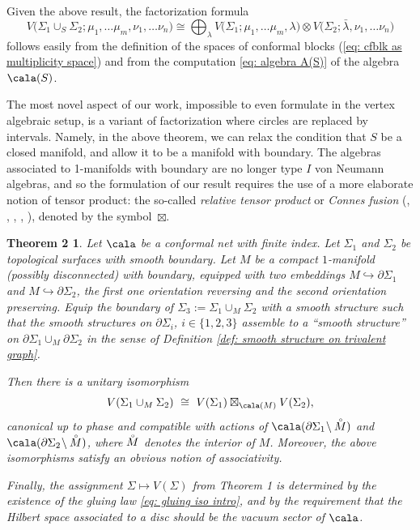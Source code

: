 \documentclass[a4paper,10pt,leqno]{amsart}
\theoremstyle{plain}
\newtheorem*{theorem4*}{Theorem 2}
\theoremstyle{definition}
\theoremstyle{remark}
\begin{document}
Given the above result, the factorization formula
\[
V\big(\Sigma_1\cup_S\Sigma_2;\mu_1,\ldots\mu_m,\nu_1,\ldots\nu_n\big) \cong {\bigoplus}_\lambda V\big(\Sigma_1;\mu_1,\ldots\mu_m,\lambda\big)\otimes
V\big(\Sigma_2;\bar\lambda,\nu_1,\ldots\nu_n\big)
\]
follows easily from the definition of the spaces of conformal blocks (\ref{eq: cfblk as multiplicity space}) and from the computation \eqref{eq: algebra A(S)} of the algebra $\cala(S)$. 

The most novel aspect of our work, impossible to even formulate in the vertex algebraic setup, is a variant of factorization where circles are replaced by intervals.
Namely, in the above theorem, we can relax the condition that $S$ be a closed manifold, and allow it to be a manifold with boundary.
The algebras associated to 1-manifolds with boundary are no longer type $I$ von Neumann algebras, and so
the formulation of our result requires the use of a more elaborate notion of tensor product: the so-called \emph{relative tensor product} or \emph{Connes fusion} (\cite{BDH(dualizability)}, \cite{Bisch(Bimodules)}, \cite{Connes(Non-commutative-geometry)}, \cite{Sauvageot(Sur-le-produit-tensoriel-relatif)}, \cite{Wassermann(Operator-algebras-and-conformal-field-theory)}), denoted by the symbol~$\boxtimes$.

\begin{theorem4*}
Let $\cala$ be a conformal net with finite index.
Let $\Sigma_1$ and $\Sigma_2$ be topological surfaces with smooth boundary.
Let $M$ be a compact $1$-manifold (possibly disconnected) with boundary, equipped with two
embeddings $M\hookrightarrow \partial \Sigma_1$ and $M\hookrightarrow \partial \Sigma_2$,
the first one orientation reversing and the second orientation preserving.
Equip the boundary of $\Sigma_3:=\Sigma_1\cup_M \Sigma_2$ with a smooth structure such that
the smooth structures on $\partial\Sigma_i$, $i\in\{1,2,3\}$ assemble to a ``smooth structure'' on $\partial\Sigma_1\cup_M \partial\Sigma_2$
in the sense of Definition \ref{def: smooth structure on trivalent graph}.

Then there is a unitary isomorphism
\begin{equation}\label{eq: gluing iso intro}
V(\Sigma_1\cup_M \Sigma_2) \,\,\cong\,\, V(\Sigma_1)\boxtimes_{\cala(M)} V(\Sigma_2),
\end{equation}
canonical up to phase
and compatible\vspace{-.03cm} with actions of $\cala(\partial\Sigma_1\!\setminus\! \put(3.9,7.5){$\scriptscriptstyle \circ$} M)$
and $\cala(\partial\Sigma_2\!\setminus\! \put(3.9,7.5){$\scriptscriptstyle \circ$} M)$, where $\put(3.9,7.5){$\scriptscriptstyle \circ$} M$ denotes the interior of $M$.
Moreover, the above isomorphisms satisfy an obvious notion of associativity.

Finally, the assignment $\Sigma\mapsto V(\Sigma)$ from Theorem 1 is determined by the existence of the gluing law \eqref{eq: gluing iso intro}, and by the requirement that the Hilbert space associated to a disc should be the vacuum sector of $\cala$.
\end{theorem4*}
\end{document}
